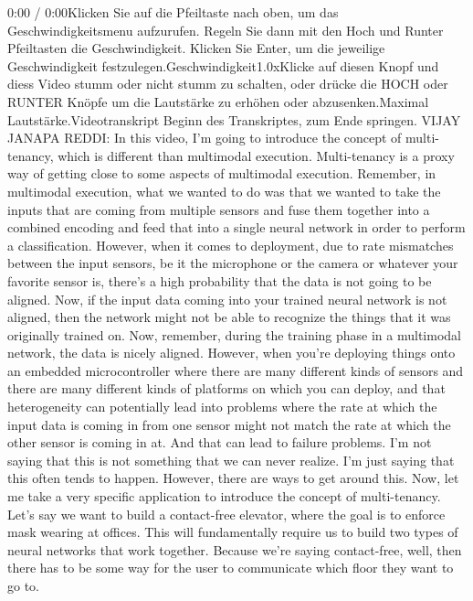     0:00 / 0:00Klicken Sie auf die Pfeiltaste nach oben, um das Geschwindigkeitsmenu aufzurufen. Regeln Sie dann mit den Hoch und Runter Pfeiltasten die Geschwindigkeit. Klicken Sie Enter, um die jeweilige Geschwindigkeit festzulegen.Geschwindigkeit1.0xKlicke auf diesen Knopf und diess Video stumm oder nicht stumm zu schalten, oder drücke die HOCH oder RUNTER Knöpfe um die Lautstärke zu erhöhen oder abzusenken.Maximal Lautstärke.Videotranskript
    Beginn des Transkriptes, zum Ende springen.
    VIJAY JANAPA REDDI: In this video, I'm going
    to introduce the concept of multi-tenancy, which
    is different than multimodal execution.
    Multi-tenancy is a proxy way of getting close
    to some aspects of multimodal execution.
    Remember, in multimodal execution, what we wanted to do
    was that we wanted to take the inputs that are coming from multiple sensors
    and fuse them together into a combined encoding
    and feed that into a single neural network
    in order to perform a classification.
    However, when it comes to deployment, due
    to rate mismatches between the input sensors,
    be it the microphone or the camera or whatever your favorite sensor is,
    there's a high probability that the data is not going to be aligned.
    Now, if the input data coming into your trained neural network is not aligned,
    then the network might not be able to recognize the things
    that it was originally trained on.
    Now, remember, during the training phase in a multimodal network,
    the data is nicely aligned.
    However, when you're deploying things onto an embedded microcontroller
    where there are many different kinds of sensors
    and there are many different kinds of platforms on which you can deploy,
    and that heterogeneity can potentially lead into problems where
    the rate at which the input data is coming in from one sensor
    might not match the rate at which the other sensor is coming in at.
    And that can lead to failure problems.
    I'm not saying that this is not something that we can never realize.
    I'm just saying that this often tends to happen.
    However, there are ways to get around this.
    Now, let me take a very specific application
    to introduce the concept of multi-tenancy.
    Let's say we want to build a contact-free elevator, where the goal
    is to enforce mask wearing at offices.
    This will fundamentally require us to build two types of neural networks
    that work together.
    Because we're saying contact-free, well, then there
    has to be some way for the user to communicate
    which floor they want to go to.
